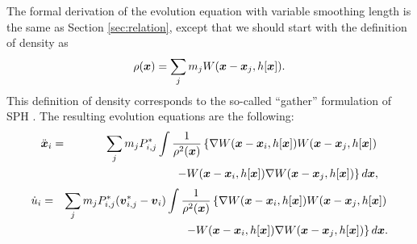 \documentclass{cjour}
\newcommand{ \Vec   }[1]{ \mbox{\boldmath $ #1 $} }
\begin{document}
\begin{article}
The formal derivation of the evolution equation with 
variable smoothing length is the same as Section \ref{sec:relation}, 
except that we should start with the definition of 
density as 
\begin{equation}
               \rho(\Vec{x}) = 
               \sum_{j} m_{j} W(\Vec{x} - \Vec{x}_{j} , h[\Vec{x}] ).
                                                      \label{eq:Dsph2}
\end{equation}
This definition of density corresponds to the so-called ``gather'' 
formulation of SPH \cite{HK:1989}. 
The resulting evolution equations are the following:
\begin{eqnarray}
                \ddot{\Vec{x}}_i & = & 
                \sum_{j} m_j
                         P^*_{i,j} 
                         \int \frac{1}{ \rho^2(\Vec{x}) }
                         \left\{ 
                                 \nabla W(\Vec{x}-\Vec{x}_i,h[\Vec{x}] )
                                        W(\Vec{x}-\Vec{x}_j,h[\Vec{x}] )
                         \right.
                                             \nonumber \\
            & & ~~~~~~~~~~~~~~~~~~~~~~~~~~~  
                         \left.
                               -        W(\Vec{x}-\Vec{x}_i,h[\Vec{x}] )
                                 \nabla W(\Vec{x}-\Vec{x}_j,h[\Vec{x}] )
                         \right\} 
                         d\Vec{x} , 
                                                        \label{eq:EoM6}
\end{eqnarray}
%
\begin{eqnarray}
                \dot{u}_i &  = &
                \sum_{j} m_j
                   P^*_{i,j} ( \Vec{v}^*_{i,j} - \Vec{v}_i )  
                   \int \frac{1}{ \rho^2(\Vec{x}) }         
                        \left\{ 
                                  \nabla W(\Vec{x}-\Vec{x}_i,h[\Vec{x}])
                                         W(\Vec{x}-\Vec{x}_j,h[\Vec{x}])
                         \right.
                                             \nonumber \\
            & & ~~~~~~~~~~~~~~~~~~~~~~~~~~~~~  
                         \left.
                                -        W(\Vec{x}-\Vec{x}_i,h[\Vec{x}])
                                  \nabla W(\Vec{x}-\Vec{x}_j,h[\Vec{x}])
                        \right\} 
                   d\Vec{x}. 

\end{eqnarray}
\end{article}
\end{document}

